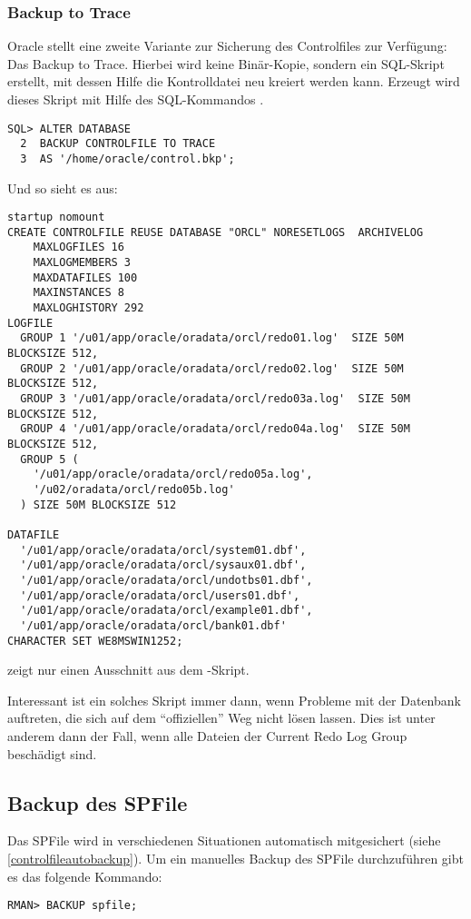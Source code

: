         \subsubsection{Backup to Trace}
          Oracle stellt eine zweite Variante zur Sicherung des Controlfiles zur Verf\"ugung: Das Backup to Trace. Hierbei wird keine Bin\"ar-Kopie, sondern ein SQL-Skript erstellt, mit dessen Hilfe die Kontrolldatei neu kreiert werden kann. Erzeugt wird dieses Skript mit Hilfe des SQL-Kommandos .
        \begin{lstlisting}[caption={Kontrolldatei in ein Backup mit einschlie\ss{}en},label=admin1324,language=oracle_sql]
SQL> ALTER DATABASE
  2  BACKUP CONTROLFILE TO TRACE
  3  AS '/home/oracle/control.bkp';
        \end{lstlisting}
        Und so sieht es aus:
        \begin{lstlisting}[caption={Das \languageorasql{CREATE CONTROLFILE}-Skript},label=admin1325,language=oracle_sql]
startup nomount
CREATE CONTROLFILE REUSE DATABASE "ORCL" NORESETLOGS  ARCHIVELOG
    MAXLOGFILES 16
    MAXLOGMEMBERS 3
    MAXDATAFILES 100
    MAXINSTANCES 8
    MAXLOGHISTORY 292
LOGFILE
  GROUP 1 '/u01/app/oracle/oradata/orcl/redo01.log'  SIZE 50M BLOCKSIZE 512,
  GROUP 2 '/u01/app/oracle/oradata/orcl/redo02.log'  SIZE 50M BLOCKSIZE 512,
  GROUP 3 '/u01/app/oracle/oradata/orcl/redo03a.log'  SIZE 50M BLOCKSIZE 512,
  GROUP 4 '/u01/app/oracle/oradata/orcl/redo04a.log'  SIZE 50M BLOCKSIZE 512,
  GROUP 5 (
    '/u01/app/oracle/oradata/orcl/redo05a.log',
    '/u02/oradata/orcl/redo05b.log'
  ) SIZE 50M BLOCKSIZE 512

DATAFILE
  '/u01/app/oracle/oradata/orcl/system01.dbf',
  '/u01/app/oracle/oradata/orcl/sysaux01.dbf',
  '/u01/app/oracle/oradata/orcl/undotbs01.dbf',
  '/u01/app/oracle/oradata/orcl/users01.dbf',
  '/u01/app/oracle/oradata/orcl/example01.dbf',
  '/u01/app/oracle/oradata/orcl/bank01.dbf'
CHARACTER SET WE8MSWIN1252;
          \end{lstlisting}
           zeigt nur einen Ausschnitt aus dem -Skript.

          Interessant ist ein solches Skript immer dann, wenn Probleme mit der Datenbank auftreten, die sich auf dem \enquote{offiziellen} Weg nicht l\"osen lassen. Dies ist unter anderem dann der Fall, wenn alle Dateien der Current Redo Log Group besch\"adigt sind.
      \subsection{Backup des SPFile}
        Das SPFile wird in verschiedenen Situationen automatisch mitgesichert (siehe \ref{controlfileautobackup}). Um ein manuelles Backup des SPFile durchzuf\"uhren gibt es das folgende Kommando:
        \begin{lstlisting}[caption={Manuelles Backup des SPFile},label=admin1326,language=rman]
RMAN> BACKUP spfile;
          \end{lstlisting}
